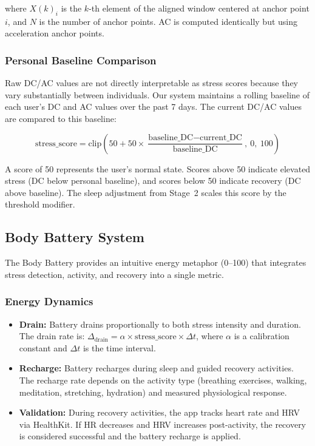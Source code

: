 \documentclass[12pt,letterpaper]{article}
\begin{document}
where $X(k)_i$ is the $k$-th element of the aligned window centered at anchor point $i$, and $N$ is the number of anchor points. AC is computed identically but using acceleration anchor points.

\subsubsection{Personal Baseline Comparison}

Raw DC/AC values are not directly interpretable as stress scores because they vary substantially between individuals. Our system maintains a rolling baseline of each user's DC and AC values over the past 7 days. The current DC/AC values are compared to this baseline:

\begin{equation}
    \text{stress\_score} = \text{clip}\left(50 + 50 \times \frac{\text{baseline\_DC} - \text{current\_DC}}{\text{baseline\_DC}}, \ 0, \ 100\right)
\end{equation}

A score of 50 represents the user's normal state. Scores above 50 indicate elevated stress (DC below personal baseline), and scores below 50 indicate recovery (DC above baseline). The sleep adjustment from Stage~2 scales this score by the threshold modifier.

\subsection{Body Battery System}

The Body Battery provides an intuitive energy metaphor (0--100) that integrates stress detection, activity, and recovery into a single metric.

\subsubsection{Energy Dynamics}

\begin{itemize}
    \item \textbf{Drain:} Battery drains proportionally to both stress intensity and duration. The drain rate is: $\Delta_{\text{drain}} = \alpha \times \text{stress\_score} \times \Delta t$, where $\alpha$ is a calibration constant and $\Delta t$ is the time interval.
    \item \textbf{Recharge:} Battery recharges during sleep and guided recovery activities. The recharge rate depends on the activity type (breathing exercises, walking, meditation, stretching, hydration) and measured physiological response.
    \item \textbf{Validation:} During recovery activities, the app tracks heart rate and HRV via HealthKit. If HR decreases and HRV increases post-activity, the recovery is considered successful and the battery recharge is applied.
\end{itemize}
\end{document}
